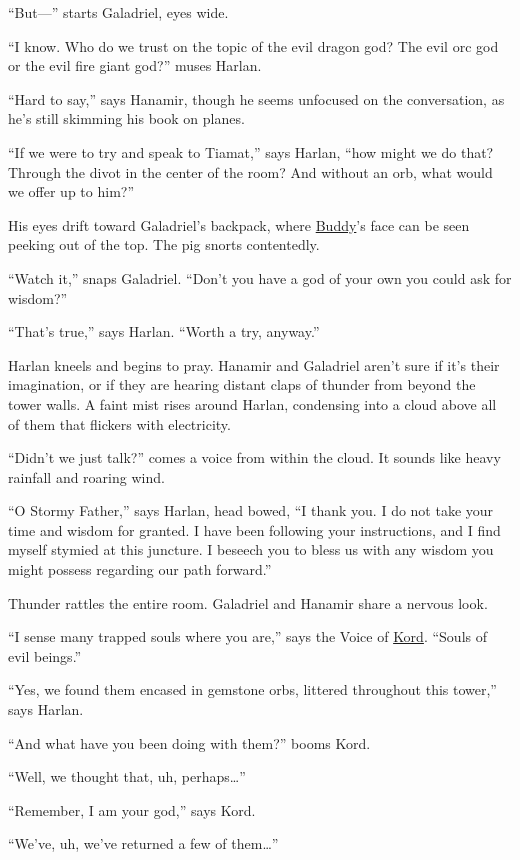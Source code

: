 \documentclass[smalldemyvopaper,11pt,twoside,onecolumn,openright,extrafontsizes]{memoir}
\begin{document}
``But---'' starts Galadriel, eyes wide.

``I know. Who do we trust on the topic of the evil dragon god? The evil
orc god or the evil fire giant god?'' muses Harlan.

``Hard to say,'' says Hanamir, though he seems unfocused on the
conversation, as he's still skimming his book on planes.

``If we were to try and speak to Tiamat,'' says Harlan, ``how might we
do that? Through the divot in the center of the room? And without an
orb, what would we offer up to him?''

His eyes drift toward Galadriel's backpack, where
\href{/characters/buddy/}{Buddy}'s face can be seen peeking out of the
top. The pig snorts contentedly.

``Watch it,'' snaps Galadriel. ``Don't you have a god of your own you
could ask for wisdom?''

``That's true,'' says Harlan. ``Worth a try, anyway.''

Harlan kneels and begins to pray. Hanamir and Galadriel aren't sure if
it's their imagination, or if they are hearing distant claps of thunder
from beyond the tower walls. A faint mist rises around Harlan,
condensing into a cloud above all of them that flickers with
electricity.

``Didn't we just talk?'' comes a voice from within the cloud. It sounds
like heavy rainfall and roaring wind.

``O Stormy Father,'' says Harlan, head bowed, ``I thank you. I do not
take your time and wisdom for granted. I have been following your
instructions, and I find myself stymied at this juncture. I beseech you
to bless us with any wisdom you might possess regarding our path
forward.''

Thunder rattles the entire room. Galadriel and Hanamir share a nervous
look.

``I sense many trapped souls where you are,'' says the Voice of
\href{/characters/kord/}{Kord}. ``Souls of evil beings.''

``Yes, we found them encased in gemstone orbs, littered throughout this
tower,'' says Harlan.

``And what have you been doing with them?'' booms Kord.

``Well, we thought that, uh, perhaps\ldots{}''

``Remember, I am your god,'' says Kord.

``We've, uh, we've returned a few of them\ldots{}''
\end{document}
